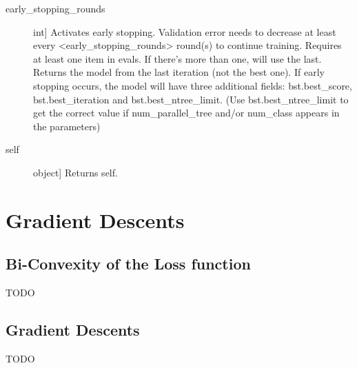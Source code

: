 \documentclass[letterpaper,10pt,english]{sphinxmanual}
\begin{document}
\begin{fulllineitems}
\begin{fulllineitems}
\begin{description}
\item[{early\_stopping\_rounds}] \leavevmode{[}int{]}
Activates early stopping. Validation error needs to decrease at
least every \textless{}early\_stopping\_rounds\textgreater{} round(s) to continue training.
Requires at least one item in evals.  If there’s more than one,
will use the last. Returns the model from the last iteration
(not the best one). If early stopping occurs, the model will
have three additional fields: bst.best\_score, bst.best\_iteration
and bst.best\_ntree\_limit.
(Use bst.best\_ntree\_limit to get the correct value if num\_parallel\_tree
and/or num\_class appears in the parameters)

\end{description}
\begin{description}
\item[{self}] \leavevmode{[}object{]}
Returns self.

\end{description}

\end{fulllineitems}


\end{fulllineitems}



\chapter{Gradient Descents}
\label{\detokenize{sections/gradient_descents:gradient-descents}}\label{\detokenize{sections/gradient_descents:id1}}\label{\detokenize{sections/gradient_descents::doc}}

\section{Bi-Convexity of the Loss function}
\label{\detokenize{sections/gradient_descents:bi-convexity-of-the-loss-function}}
TODO


\section{Gradient Descents}
\label{\detokenize{sections/gradient_descents:id2}}
TODO

\label{\detokenize{sections/gradient_descents:module-utilities.GradientDescents}}
\end{document}
